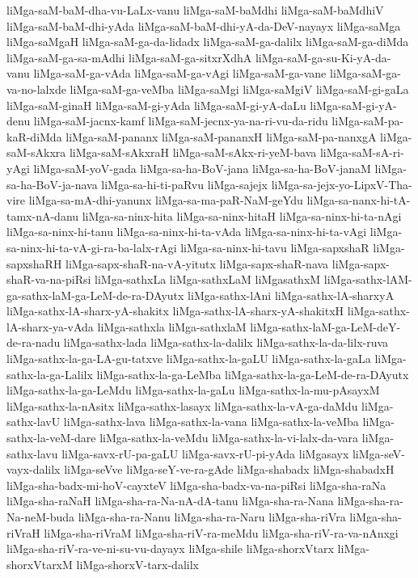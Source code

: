 {liMga-saM-baM-dha-vu-LaLx-vanu
liMga-saM-baMdhi
liMga-saM-baMdhiV
liMga-saM-baM-dhi-yAda
liMga-saM-baM-dhi-yA-da-DeV-nayayx
liMga-saMga
liMga-saMgaH
liMga-saM-ga-da-lidadx
liMga-saM-ga-dalilx
liMga-saM-ga-diMda
liMga-saM-ga-sa-mAdhi
liMga-saM-ga-sitxrXdhA
liMga-saM-ga-su-Ki-yA-da-vanu
liMga-saM-ga-vAda
liMga-saM-ga-vAgi
liMga-saM-ga-vane
liMga-saM-ga-va-no-lalxde
liMga-saM-ga-veMba
liMga-saMgi
liMga-saMgiV
liMga-saM-gi-gaLa
liMga-saM-ginaH
liMga-saM-gi-yAda
liMga-saM-gi-yA-daLu
liMga-saM-gi-yA-denu
liMga-saM-jacnx-kamf
liMga-saM-jecnx-ya-na-ri-vu-da-ridu
liMga-saM-pa-kaR-diMda
liMga-saM-pananx
liMga-saM-pananxH
liMga-saM-pa-nanxgA
liMga-saM-sAkxra
liMga-saM-sAkxraH
liMga-saM-sAkx-ri-yeM-bava
liMga-saM-sA-ri-yAgi
liMga-saM-yoV-gada
liMga-sa-ha-BoV-jana
liMga-sa-ha-BoV-janaM
liMga-sa-ha-BoV-ja-nava
liMga-sa-hi-ti-paRvu
liMga-sajejx
liMga-sa-jejx-yo-LipxV-Tha-vire
liMga-sa-mA-dhi-yanunx
liMga-sa-ma-paR-NaM-geYdu
liMga-sa-nanx-hi-tA-tamx-nA-danu
liMga-sa-ninx-hita
liMga-sa-ninx-hitaH
liMga-sa-ninx-hi-ta-nAgi
liMga-sa-ninx-hi-tanu
liMga-sa-ninx-hi-ta-vAda
liMga-sa-ninx-hi-ta-vAgi
liMga-sa-ninx-hi-ta-vA-gi-ra-ba-lalx-rAgi
liMga-sa-ninx-hi-tavu
liMga-sapxshaR
liMga-sapxshaRH
liMga-sapx-shaR-na-vA-yitutx
liMga-sapx-shaR-nava
liMga-sapx-shaR-va-na-piRsi
liMga-sathxLa
liMga-sathxLaM
liMgasathxM
liMga-sathx-lAM-ga-sathx-laM-ga-LeM-de-ra-DAyutx
liMga-sathx-lAni
liMga-sathx-lA-sharxyA
liMga-sathx-lA-sharx-yA-shakitx
liMga-sathx-lA-sharx-yA-shakitxH
liMga-sathx-lA-sharx-ya-vAda
liMga-sathxla
liMga-sathxlaM
liMga-sathx-laM-ga-LeM-deY-de-ra-nadu
liMga-sathx-lada
liMga-sathx-la-dalilx
liMga-sathx-la-da-lilx-ruva
liMga-sathx-la-ga-LA-gu-tatxve
liMga-sathx-la-gaLU
liMga-sathx-la-gaLa
liMga-sathx-la-ga-Lalilx
liMga-sathx-la-ga-LeMba
liMga-sathx-la-ga-LeM-de-ra-DAyutx
liMga-sathx-la-ga-LeMdu
liMga-sathx-la-gaLu
liMga-sathx-la-mu-pAsayxM
liMga-sathx-la-nAsitx
liMga-sathx-lasayx
liMga-sathx-la-vA-ga-daMdu
liMga-sathx-lavU
liMga-sathx-lava
liMga-sathx-la-vana
liMga-sathx-la-veMba
liMga-sathx-la-veM-dare
liMga-sathx-la-veMdu
liMga-sathx-la-vi-lalx-da-vara
liMga-sathx-lavu
liMga-savx-rU-pa-gaLU
liMga-savx-rU-pi-yAda
liMgasayx
liMga-seV-vayx-dalilx
liMga-seVve
liMga-seY-ve-ra-gAde
liMga-shabadx
liMga-shabadxH
liMga-sha-badx-mi-hoV-cayxteV
liMga-sha-badx-va-na-piRsi
liMga-sha-raNa
liMga-sha-raNaH
liMga-sha-ra-Na-nA-dA-tanu
liMga-sha-ra-Nana
liMga-sha-ra-Na-neM-buda
liMga-sha-ra-Nanu
liMga-sha-ra-Naru
liMga-sha-riVra
liMga-sha-riVraH
liMga-sha-riVraM
liMga-sha-riV-ra-meMdu
liMga-sha-riV-ra-va-nAnxgi
liMga-sha-riV-ra-ve-ni-su-vu-dayayx
liMga-shile
liMga-shorxVtarx
liMga-shorxVtarxM
liMga-shorxV-tarx-dalilx
}
